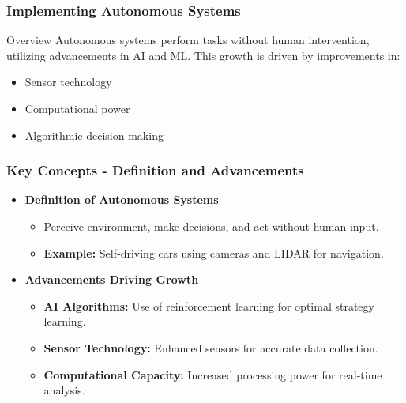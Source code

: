 \documentclass[aspectratio=169]{beamer}
\begin{document}
\begin{frame}[fragile]
    \frametitle{Implementing Autonomous Systems}
    \begin{block}{Overview}
        Autonomous systems perform tasks without human intervention, utilizing advancements in AI and ML. This growth is driven by improvements in:
        \begin{itemize}
            \item Sensor technology
            \item Computational power
            \item Algorithmic decision-making
        \end{itemize}
    \end{block}
\end{frame}

\begin{frame}[fragile]
    \frametitle{Key Concepts - Definition and Advancements}
    \begin{itemize}
        \item \textbf{Definition of Autonomous Systems}
        \begin{itemize}
            \item Perceive environment, make decisions, and act without human input.
            \item \textbf{Example:} Self-driving cars using cameras and LIDAR for navigation.
        \end{itemize}
        
        \item \textbf{Advancements Driving Growth}
        \begin{itemize}
            \item \textbf{AI Algorithms:} Use of reinforcement learning for optimal strategy learning.
            \item \textbf{Sensor Technology:} Enhanced sensors for accurate data collection.
            \item \textbf{Computational Capacity:} Increased processing power for real-time analysis.
        \end{itemize}
    \end{itemize}
\end{frame}
\end{document}
